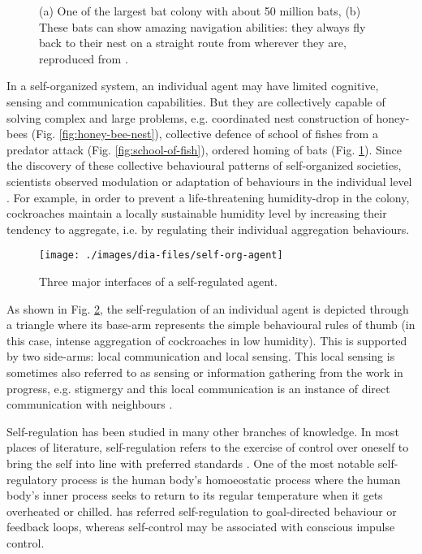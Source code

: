 \begin{figure}[H]
\centering
{} 
\hspace{0.25cm}
\caption{(a) One of the largest bat colony with about 50 million bats, (b) These bats can show amazing navigation abilities: they always fly back to their nest on a straight route from wherever they are, reproduced from \protect{}.}
\label{fig:bats-colony}
\end{figure}

In a self-organized system, an individual agent may have limited cognitive, sensing and communication capabilities. But they are collectively capable of solving complex and large problems, e.g. coordinated nest construction of honey-bees (Fig. \ref{fig:honey-bee-nest}), collective defence of school of fishes from a predator attack (Fig. \ref{fig:school-of-fish}), ordered homing of bats (Fig. \ref{fig:bats-colony}).  Since the discovery of these collective behavioural patterns of self-organized societies, scientists observed modulation or adaptation of behaviours in the individual level \cite{Garnier+2007}. For example, in order to prevent a life-threatening humidity-drop in the colony, cockroaches maintain a locally sustainable humidity level by increasing their tendency to aggregate, i.e. by regulating their individual aggregation behaviours. 
\begin{figure}[H]
\centering
\texttt{[image: ./images/dia-files/self-org-agent]}
\caption{ Three major interfaces of a self-regulated agent.}
\label{fig:self-org-agent} %
\end{figure}
As shown in Fig. \ref{fig:self-org-agent}, the  self-regulation of an individual agent is depicted through a triangle where its base-arm represents the simple behavioural rules of thumb (in this case, intense aggregation of cockroaches in low humidity). This is supported by two side-arms: local communication and local sensing. This local sensing is sometimes also referred to as sensing or information gathering from the work in progress, e.g. stigmergy and this local communication is an instance of direct communication with neighbours  \cite{Camazine+2001}.

Self-regulation has been studied in many other branches of knowledge. In most places of literature, self-regulation refers to the exercise of control over oneself to bring the self into line with preferred standards \cite{Baumeister+2007}. One of the most notable self-regulatory process is the human body's homoeostatic process where the human body's inner process seeks to return to its regular temperature when it gets overheated or chilled.  has referred self-regulation to goal-directed behaviour or feedback loops, whereas self-control may be associated with conscious impulse control.

